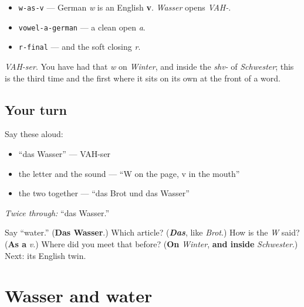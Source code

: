 \begin{sounds}
\begin{itemize}
\raggedright
  \item \texttt{w-as-v} — German \emph{w} is an English \textbf{v}. \emph{Wasser} opens \emph{VAH-}.
  \item \texttt{vowel-a-german} — a clean open \emph{a}.
  \item \texttt{r-final} — and the soft closing \emph{r}.
\end{itemize}

\emph{VAH-ser}. You have had that \emph{w} on \emph{Winter}, and inside the \emph{shv-} of \emph{Schwester}; this is the third time and the first where it sits on its own at the front of a word.
\end{sounds}

\subsection*{Your turn}
Say these aloud:

\begin{itemize}
\raggedright
  \item \textquotedblleft{}das Wasser\textquotedblright{} — VAH-ser
  \item the letter and the sound — \textquotedblleft{}W on the page, v in the mouth\textquotedblright{}
  \item the two together — \textquotedblleft{}das Brot und das Wasser\textquotedblright{}
\end{itemize}

\emph{Twice through:} \textquotedblleft{}das Wasser.\textquotedblright{}

\begin{tcolorbox}[breakable,colback=teal!4,colframe=teal!35!black,title={Before you move on}]
Say \textquotedblleft{}water.\textquotedblright{} (\textbf{Das Wasser}.) Which article? (\emph{\textbf{Das}}, like \emph{Brot}.) How is the \emph{W} said? (\textbf{As a} \emph{v}.) Where did you meet that before? (\textbf{On} \emph{Winter}, \textbf{and inside} \emph{Schwester}.) Next: its English twin.
\end{tcolorbox}
\section[Wasser und water]{Wasser and water}

\label{lesson:GE-C11-wasser-water}



